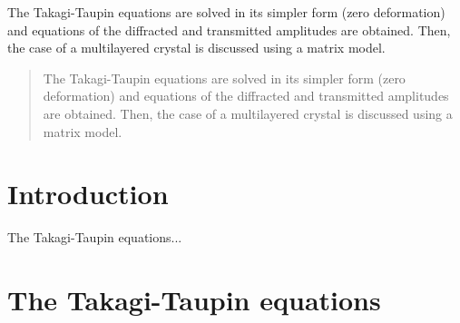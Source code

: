 \documentclass[preprint]{iucr}              %
\begin{document}
\maketitle                        %

\begin{synopsis}
The Takagi-Taupin equations are solved in its simpler form (zero deformation) and equations of the diffracted and transmitted amplitudes are obtained. Then, the case of a multilayered crystal is discussed using a matrix model. 
\end{synopsis}

\begin{abstract}

The Takagi-Taupin equations are solved in its simpler form (zero deformation) and equations of the diffracted and transmitted amplitudes are obtained. Then, the case of a multilayered crystal is discussed using a matrix model. 

\end{abstract}



\section{Introduction}

The Takagi-Taupin \cite{Takagi1962, Taupin, Taupin1967} equations...

%
\section{The Takagi-Taupin equations}
\label{sec:TT}
\end{document}
